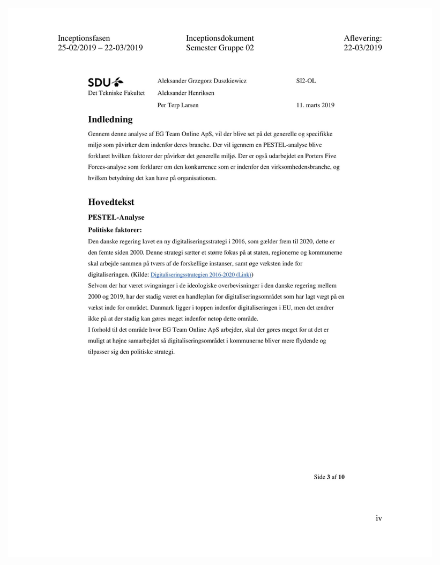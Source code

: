 \begin{figure}[hb]
  \includegraphics[scale = 0.33]{./PNG/Inceptions/Gruppe02+InceptionsDokument-37.jpg} 
\end{figure}

